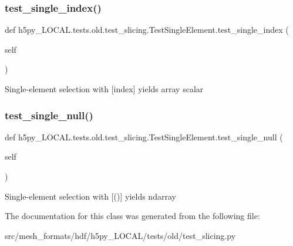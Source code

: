 \subsubsection{\texorpdfstring{test\+\_\+single\+\_\+index()}{test\_single\_index()}}
{\footnotesize\ttfamily def h5py\+\_\+\+L\+O\+C\+A\+L.\+tests.\+old.\+test\+\_\+slicing.\+Test\+Single\+Element.\+test\+\_\+single\+\_\+index (\begin{DoxyParamCaption}\item[{}]{self }\end{DoxyParamCaption})}

\begin{DoxyVerb}Single-element selection with [index] yields array scalar \end{DoxyVerb}
 \mbox{\label{classh5py__LOCAL_1_1tests_1_1old_1_1test__slicing_1_1TestSingleElement_a82b1d8a654e8b79651909d21c7648fa3}} 
\subsubsection{\texorpdfstring{test\+\_\+single\+\_\+null()}{test\_single\_null()}}
{\footnotesize\ttfamily def h5py\+\_\+\+L\+O\+C\+A\+L.\+tests.\+old.\+test\+\_\+slicing.\+Test\+Single\+Element.\+test\+\_\+single\+\_\+null (\begin{DoxyParamCaption}\item[{}]{self }\end{DoxyParamCaption})}

\begin{DoxyVerb}Single-element selection with [()] yields ndarray \end{DoxyVerb}
 

The documentation for this class was generated from the following file\+:\begin{DoxyCompactItemize}
\item 
src/mesh\+\_\+formats/hdf/h5py\+\_\+\+L\+O\+C\+A\+L/tests/old/test\+\_\+slicing.\+py\end{DoxyCompactItemize}
